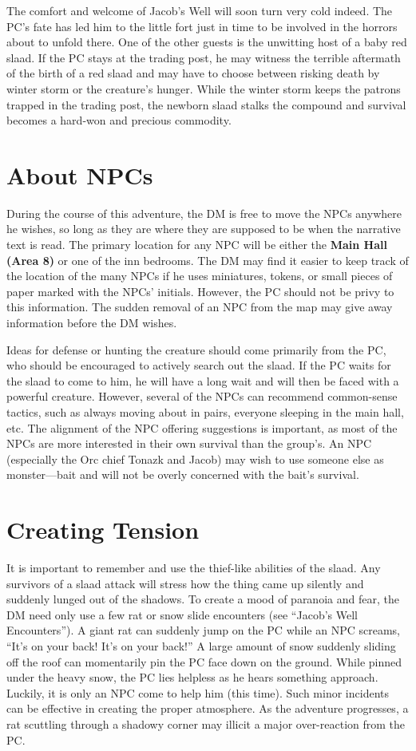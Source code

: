 \documentclass[a5paper,11pt,twoside]{book}
\newcommand{\MapText}[1]{
	{\color{DarkCyan} \textbf{#1}}
}
\begin{document}
The comfort and welcome of Jacob’s Well will soon turn very cold indeed.
The PC’s fate has led him to the little fort just in time to be involved in the horrors about to unfold there.
One of the other guests is the unwitting host of a baby red slaad.
If the PC stays at the trading post, he may witness the terrible aftermath of the birth of a red slaad and may have to choose between risking death by winter storm or the creature’s hunger.
While the winter storm keeps the patrons trapped in the trading post, the newborn slaad stalks the compound and survival becomes a hard-won and precious commodity.

\pagebreak
\section*{About NPCs} During the course of this adventure, the DM is free to move the NPCs anywhere he wishes, so long as they are where they are supposed to be when the narrative text is read.
The primary location for any NPC will be either the \MapText{Main Hall (Area 8)} or one of the inn bedrooms.
The DM may find it easier to keep track of the location of the many NPCs if he uses miniatures, tokens, or small pieces of paper marked with the NPCs’ initials.
However, the PC should not be privy to this information.
The sudden removal of an NPC from the map may give away information before the DM wishes.

Ideas for defense or hunting the creature should come primarily from the PC, who should be encouraged to actively search out the slaad.
If the PC waits for the slaad to come to him, he will have a long wait and will then be faced with a powerful creature.
However, several of the NPCs can recommend common-sense tactics, such as always moving about in pairs, everyone sleeping in the main hall, etc.
The alignment of the NPC offering suggestions is important, as most of the NPCs are more interested in their own survival than the group's.
An NPC (especially the Orc chief Tonazk and Jacob) may wish to use someone else as monster—bait and will not be overly concerned with the bait's survival.

\section*{Creating Tension}It is important to remember and use the thief-like abilities of the slaad.
Any survivors of a slaad attack will stress how the thing came up silently and suddenly lunged out of the shadows.
To create a mood of paranoia and fear, the DM need only use a few rat or snow slide encounters (see “Jacob’s Well Encounters”).
A giant rat can suddenly jump on the PC while an NPC screams, “It’s on your back!
It’s on your back!” A large amount of snow suddenly sliding off the roof can momentarily pin the PC face down on the ground.
While pinned under the heavy snow, the PC lies helpless as he hears something approach.
Luckily, it is only an NPC come to help him (this time).
Such minor incidents can be effective in creating the proper atmosphere.
As the adventure progresses, a rat scuttling through a shadowy corner may illicit a major over-reaction from the PC.
\end{document}
